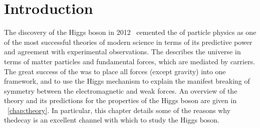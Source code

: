 \chapter{Introduction}
\label{chap:intro}

The discovery of the Higgs boson in 2012~\cite{CMSHDisc,ATLASHDisc} cemented the \SM of particle physics as one of the most successful theories of modern science in terms of its predictive power and agreement with experimental observations. The \SM describes the universe in terms of matter particles and fundamental forces, which are mediated by carriers. The great success of the \SM was to place all forces (except gravity) into one framework, and to use the Higgs mechanism to explain the manifest breaking of symmetry between the electromagnetic and weak forces. An overview of the theory and its predictions for the properties of the Higgs boson are given in \Chap~\ref{chap:theory}. In particular, this chapter details some of the reasons why the\Hgg decay is an excellent channel with which to study the Higgs boson. %

